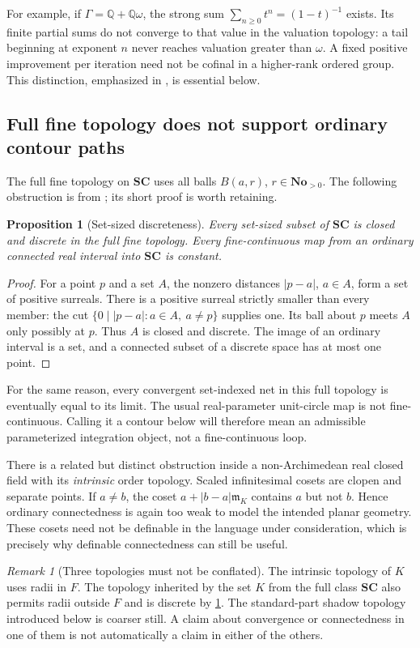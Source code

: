 \documentclass[11pt,letterpaper]{article}
\newtheorem{proposition}[theorem]{Proposition}
\theoremstyle{definition}
\theoremstyle{remark}
\newtheorem{remark}[theorem]{Remark}
\newcommand{\No}{\mathbf{No}}
\newcommand{\SC}{\mathbf{SC}}
\newcommand{\Q}{\mathbb Q}
\newcommand{\m}{\mathfrak m}
\numberwithin{equation}{section}
\begin{document}
For example, if $\Gamma=\Q+\Q\omega$, the strong sum $\sum_{n\ge0}t^n=(1-t)^{-1}$ exists. Its finite partial sums do not converge to that value in the valuation topology: a tail beginning at exponent $n$ never reaches valuation greater than $\omega$. A fixed positive improvement per iteration need not be cofinal in a higher-rank ordered group. This distinction, emphasized in \cite{AG}, is essential below.

\subsection{Full fine topology does not support ordinary contour paths}
The full fine topology on $\SC$ uses all balls $B(a,r)$, $r\in\No_{>0}$. The following obstruction is from \cite[\S3]{SA}; its short proof is worth retaining.

\begin{proposition}[Set-sized discreteness]\label{prop:fine}
Every set-sized subset of $\SC$ is closed and discrete in the full fine topology. Every fine-continuous map from an ordinary connected real interval into $\SC$ is constant.
\end{proposition}
\begin{proof}
For a point $p$ and a set $A$, the nonzero distances $|p-a|$, $a\in A$, form a set of positive surreals. There is a positive surreal strictly smaller than every member: the cut $\{0\mid |p-a|:a\in A,\ a\ne p\}$ supplies one. Its ball about $p$ meets $A$ only possibly at $p$. Thus $A$ is closed and discrete. The image of an ordinary interval is a set, and a connected subset of a discrete space has at most one point.
\end{proof}
For the same reason, every convergent set-indexed net in this full topology is eventually equal to its limit. The usual real-parameter unit-circle map is not fine-continuous. Calling it a contour below will therefore mean an admissible parameterized integration object, not a fine-continuous loop.

There is a related but distinct obstruction inside a non-Archimedean real closed field with its \emph{intrinsic} order topology. Scaled infinitesimal cosets are clopen and separate points. If $a\ne b$, the coset $a+|b-a|\m_K$ contains $a$ but not $b$. Hence ordinary connectedness is again too weak to model the intended planar geometry. These cosets need not be definable in the language under consideration, which is precisely why definable connectedness can still be useful.

\begin{remark}[Three topologies must not be conflated]
The intrinsic topology of $K$ uses radii in $F$. The topology inherited by the set $K$ from the full class $\SC$ also permits radii outside $F$ and is discrete by \cref{prop:fine}. The standard-part shadow topology introduced below is coarser still. A claim about convergence or connectedness in one of them is not automatically a claim in either of the others.
\end{remark}
\end{document}
